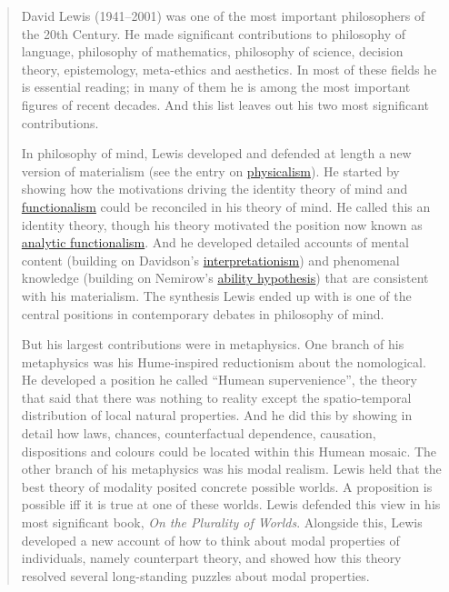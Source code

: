 \begin{quote}

David Lewis (1941--2001) was one of the most important philosophers of the 20th Century. He made significant contributions to philosophy of language, philosophy of mathematics, philosophy of science, decision theory, epistemology, meta-ethics and aesthetics. In most of these fields he is essential reading; in many of them he is among the most important figures of recent decades. And this list leaves out his two most significant contributions.

In philosophy of mind, Lewis developed and defended at length a new version of materialism (see the entry on \href{http://plato.stanford.edu/physicalism/}{physicalism}). He started by showing how the motivations driving the identity theory of mind and \href{http://plato.stanford.edu/functionalism}{functionalism} could be reconciled in his theory of mind. He called this an identity theory, though his theory motivated the position now known as \href{http://plato.stanford.edu/functionalism/index.html#AnaFun}{analytic functionalism}. And he developed detailed accounts of mental content (building on Davidson's \href{http://plato.stanford.edu/belief/index.html#1.3}{interpretationism}) and phenomenal knowledge (building on Nemirow's \href{http://plato.stanford.edu/qualia-knowledge/index.html#4.3}{ability hypothesis}) that are consistent with his materialism. The synthesis Lewis ended up with is one of the central positions in contemporary debates in philosophy of mind.

But his largest contributions were in metaphysics. One branch of his metaphysics was his Hume-inspired reductionism about the nomological. He developed a position he called ``Humean supervenience'', the theory that said that there was nothing to reality except the spatio-temporal distribution of local natural properties. And he did this by showing in detail how laws, chances, counterfactual dependence, causation, dispositions and colours could be located within this Humean mosaic. The other branch of his metaphysics was his modal realism. Lewis held that the best theory of modality posited concrete possible worlds. A proposition is possible iff it is true at one of these worlds. Lewis defended this view in his most significant book, \textit{On the Plurality of Worlds}. Alongside this, Lewis developed a new account of how to think about modal properties of individuals, namely counterpart theory, and showed how this theory resolved several long-standing puzzles about modal properties.
\end{quote}


